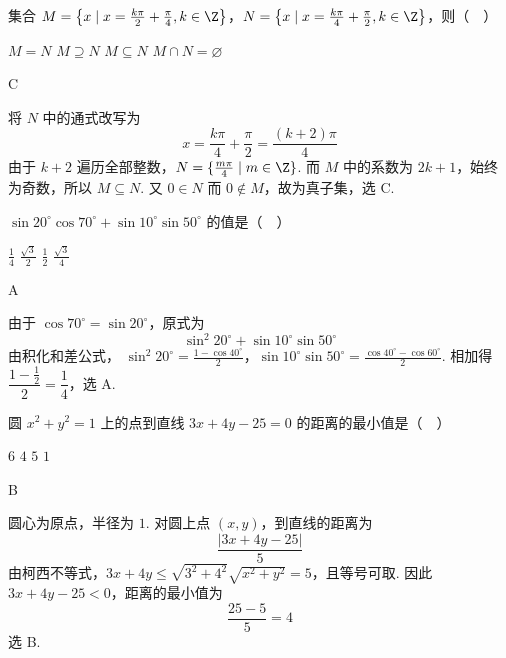\begin{problem}
集合 \(M=\left\{x \mid x=\frac{k\pi}{2}+\frac{\pi}{4}, k\in\Z\right\}\)，\(N=\left\{x \mid x=\frac{k\pi}{4}+\frac{\pi}{2}, k\in\Z\right\}\)，则（\(\quad\)）

\choices
    {\(M=N\)}
    {\(M\supseteq N\)}
    {\(M\subseteq N\)}
    {\(M\cap N=\varnothing\)}
\end{problem}

\begin{answer}
C
\end{answer}

\begin{solution}
将 \(N\) 中的通式改写为
\[
x=\frac{k\pi}{4}+\frac{\pi}{2}=\frac{(k+2)\pi}{4}
\]
由于 \(k+2\) 遍历全部整数，\(N=\{\frac{m\pi}{4}\mid m\in\Z\}\). 而 \(M\) 中的系数为 \(2k+1\)，始终为奇数，所以 \(M\subseteq N\). 又 \(0\in N\) 而 \(0\notin M\)，故为真子集，选 C.
\end{solution}

\begin{problem}
\(\sin 20^{\circ}\cos 70^{\circ}+\sin 10^{\circ}\sin 50^{\circ}\) 的值是（\(\quad\)）

\choices
    {\(\frac{1}{4}\)}
    {\(\frac{\sqrt{3}}{2}\)}
    {\(\frac{1}{2}\)}
    {\(\frac{\sqrt{3}}{4}\)}
\end{problem}

\begin{answer}
A
\end{answer}

\begin{solution}
由于 \(\cos70^\circ=\sin20^\circ\)，原式为
\[
\sin^2 20^\circ+\sin10^\circ\sin50^\circ
\]
由积化和差公式，
\(\sin^2 20^\circ=\frac{1-\cos40^\circ}{2}\)，\(\sin10^\circ\sin50^\circ=\frac{\cos40^\circ-\cos60^\circ}{2}\).
相加得 \(\dfrac{1-\frac12}{2}=\dfrac14\)，选 A.
\end{solution}

\begin{problem}
圆 \(x^2+y^2=1\) 上的点到直线 \(3x+4y-25=0\) 的距离的最小值是（\(\quad\)）

\choices
    {\(6\)}
    {\(4\)}
    {\(5\)}
    {\(1\)}
\end{problem}

\begin{answer}
B
\end{answer}

\begin{solution}
圆心为原点，半径为 \(1\). 对圆上点 \((x,y)\)，到直线的距离为
\[
\frac{|3x+4y-25|}{5}
\]
由柯西不等式，\(3x+4y\leq\sqrt{3^2+4^2}\sqrt{x^2+y^2}=5\)，且等号可取. 因此 \(3x+4y-25<0\)，距离的最小值为
\[
\frac{25-5}{5}=4
\]
选 B.
\end{solution}

